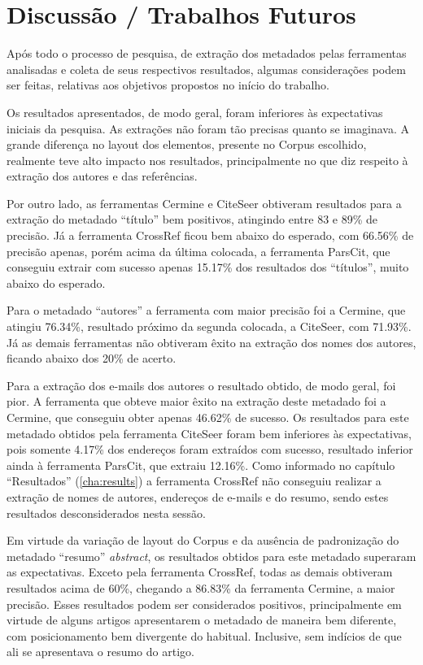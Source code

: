 
\chapter{Discussão / Trabalhos Futuros} %
\label{cha:conclusion}

Após todo o processo de pesquisa, de extração dos metadados pelas ferramentas analisadas e coleta de seus respectivos resultados, algumas considerações podem ser feitas, relativas aos objetivos propostos no início do trabalho.

Os resultados apresentados, de modo geral, foram inferiores às expectativas iniciais da pesquisa.
As extrações não foram tão precisas quanto se imaginava. 
A grande diferença no layout dos elementos, presente no Corpus escolhido, realmente teve alto impacto nos resultados, principalmente no que diz respeito à extração dos autores e das referências.

Por outro lado, as ferramentas Cermine e CiteSeer obtiveram resultados para a extração do metadado ``título'' bem positivos, atingindo entre 83 e 89\% de precisão. 
Já a ferramenta CrossRef ficou bem abaixo do esperado, com 66.56\% de precisão apenas, porém acima da última colocada, a ferramenta ParsCit, que conseguiu extrair com sucesso apenas 15.17\% dos resultados dos ``títulos'', muito abaixo do esperado.

Para o metadado ``autores'' a ferramenta com maior precisão foi a Cermine, que atingiu 76.34\%, resultado próximo da segunda colocada, a CiteSeer, com 71.93\%. 
Já as demais ferramentas não obtiveram êxito na extração dos nomes dos autores, ficando abaixo dos 20\% de acerto.

Para a extração dos e-mails dos autores o resultado obtido, de modo geral, foi pior. 
A ferramenta que obteve maior êxito na extração deste metadado foi a Cermine, que conseguiu obter apenas 46.62\% de sucesso. 
Os resultados para este metadado obtidos pela ferramenta CiteSeer foram bem inferiores às expectativas, pois somente 4.17\% dos endereços foram extraídos com sucesso, resultado inferior ainda à ferramenta ParsCit, que extraiu 12.16\%. 
Como informado no capítulo ``Resultados'' (\autoref{cha:results}) a ferramenta CrossRef não conseguiu realizar a extração de nomes de autores, endereços de e-mails e do resumo, sendo estes resultados desconsiderados nesta sessão.

Em virtude da variação de layout do Corpus e da ausência de padronização do metadado ``resumo'' \emph{abstract}, os resultados obtidos para este metadado superaram as expectativas.
Exceto pela ferramenta CrossRef, todas as demais obtiveram resultados acima de 60\%, chegando a 86.83\% da ferramenta Cermine, a maior precisão. 
Esses resultados podem ser considerados positivos, principalmente em virtude de alguns artigos apresentarem o metadado de maneira bem diferente, com posicionamento bem divergente do habitual.
Inclusive, sem indícios de que ali se apresentava o resumo do artigo.

